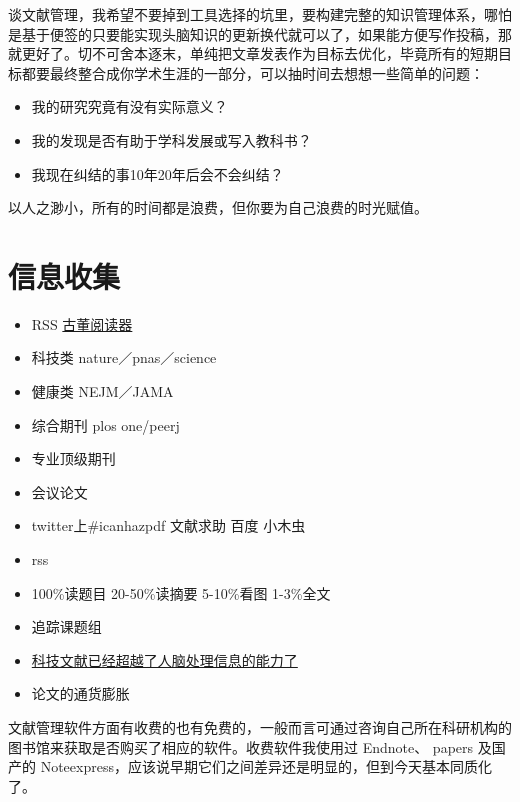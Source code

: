 \documentclass[]{tufte-book}
\providecommand{\tightlist}{%
  \setlength{\itemsep}{0pt}\setlength{\parskip}{0pt}}
\begin{document}
谈文献管理，我希望不要掉到工具选择的坑里，要构建完整的知识管理体系，哪怕是基于便签的只要能实现头脑知识的更新换代就可以了，如果能方便写作投稿，那就更好了。切不可舍本逐末，单纯把文章发表作为目标去优化，毕竟所有的短期目标都要最终整合成你学术生涯的一部分，可以抽时间去想想一些简单的问题：

\begin{itemize}
\tightlist
\item
  我的研究究竟有没有实际意义？
\item
  我的发现是否有助于学科发展或写入教科书？
\item
  我现在纠结的事10年20年后会不会纠结？
\end{itemize}

以人之渺小，所有的时间都是浪费，但你要为自己浪费的时光赋值。

\hypertarget{ux4fe1ux606fux6536ux96c6}{%
\section{信息收集}\label{ux4fe1ux606fux6536ux96c6}}

\begin{itemize}
\tightlist
\item
  RSS \href{http://readerisdead.com/reader/view/\#stream/feed\%2Fhttp\%3A\%2F\%2Ffeeds.feedburner.com\%2FWorldWarIIToday}{古董阅读器}
\item
  科技类 nature／pnas／science
\item
  健康类 NEJM／JAMA
\item
  综合期刊 plos one/peerj
\item
  专业顶级期刊
\item
  会议论文
\item
  twitter上\#icanhazpdf 文献求助 百度 小木虫
\item
  rss
\item
  100\%读题目 20-50\%读摘要 5-10\%看图 1-3\%全文
\item
  追踪课题组
\item
  \href{https://www.alternet.org/news-amp-politics/science-has-outgrown-human-mind-and-its-limited-capacities-process-information}{科技文献已经超越了人脑处理信息的能力了}
\item
  论文的通货膨胀
\end{itemize}

文献管理软件方面有收费的也有免费的，一般而言可通过咨询自己所在科研机构的图书馆来获取是否购买了相应的软件。收费软件我使用过 Endnote、 papers 及国产的 Noteexpress，应该说早期它们之间差异还是明显的，但到今天基本同质化了。
\end{document}
